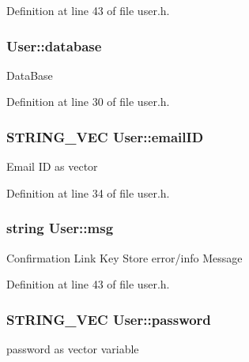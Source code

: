 Definition at line 43 of file user.\-h.

\hypertarget{classUser_ae693492927dc1ebbca8407137d1f78d3}{
\subsubsection[{database}]{ User\-::database\hspace{0.3cm}{\ttfamily [protected]}}}\label{classUser_ae693492927dc1ebbca8407137d1f78d3}
Data\-Base 

Definition at line 30 of file user.\-h.

\hypertarget{classUser_a2bc69a747b93045d1dce16bd5cd00b9b}{
\subsubsection[{email\-I\-D}]{\setlength{\rightskip}{0pt plus 5cm}S\-T\-R\-I\-N\-G\-\_\-\-V\-E\-C User\-::email\-I\-D\hspace{0.3cm}{\ttfamily [protected]}}}\label{classUser_a2bc69a747b93045d1dce16bd5cd00b9b}
Email I\-D as vector 

Definition at line 34 of file user.\-h.

\hypertarget{classUser_ac46bf208ffc0525d4f637b8458bdb49e}{
\subsubsection[{msg}]{\setlength{\rightskip}{0pt plus 5cm}string User\-::msg\hspace{0.3cm}{\ttfamily [protected]}}}\label{classUser_ac46bf208ffc0525d4f637b8458bdb49e}
Confirmation Link Key Store error/info Message 

Definition at line 43 of file user.\-h.

\hypertarget{classUser_a77b451700a9695b2a0905a12f8aedd44}{
\subsubsection[{password}]{\setlength{\rightskip}{0pt plus 5cm}S\-T\-R\-I\-N\-G\-\_\-\-V\-E\-C User\-::password\hspace{0.3cm}{\ttfamily [protected]}}}\label{classUser_a77b451700a9695b2a0905a12f8aedd44}
password as vector variable 

